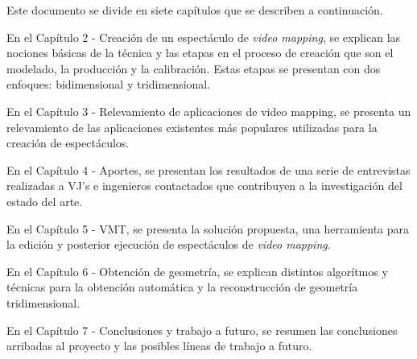 Este documento se divide en siete capítulos que se describen a continuación.

En el Capítulo 2 - Creación de un espectáculo de \emph{video mapping}, se explican las nociones básicas de la técnica y las etapas en el proceso de creación que son el modelado, la producción y la calibración. Estas etapas se presentan con dos enfoques: bidimensional y tridimensional.

En el Capítulo 3 - Relevamiento de aplicaciones de video mapping, se presenta un relevamiento de las aplicaciones existentes más populares utilizadas para la creación de espectáculos.

En el Capítulo 4 - Aportes, se presentan los resultados de una serie de entrevistas realizadas a VJ’s e ingenieros contactados que contribuyen a la investigación del estado del arte.

En el Capítulo 5 - VMT, se presenta la solución propuesta, una herramienta para la edición y posterior ejecución de espectáculos de \emph{video mapping}.

En el Capítulo 6 - Obtención de geometría, se explican distintos algorítmos y técnicas para la obtención automática y la reconstrucción de geometría tridimensional.

En el Capítulo 7 - Conclusiones y trabajo a futuro, se resumen las conclusiones arribadas al proyecto y las posibles líneas de trabajo a futuro.
